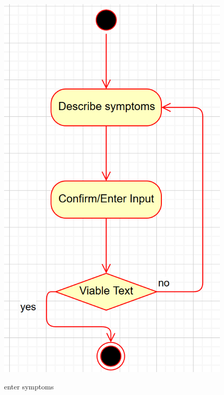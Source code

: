 \begin{figure}[H]
\begin{center}
\includegraphics[scale=1]{SystemSpec/Usecases/Diagrams/entersymActivity.png}\\
\caption{\label{fig:blue_rectangle}enter symptoms}
\end{center}
\end{figure}

